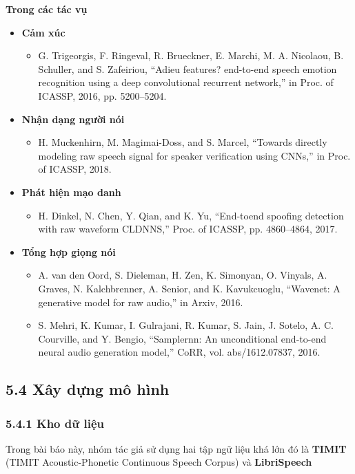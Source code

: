 \documentclass{article}
\begin{document}
	\textbf{Trong các tác vụ}
	\begin{itemize}
		\item \textbf{Cảm xúc}
		\begin{itemize}
			\item G. Trigeorgis, F. Ringeval, R. Brueckner, E. Marchi,
			M. A. Nicolaou, B. Schuller, and S. Zafeiriou, “Adieu
			features? end-to-end speech emotion recognition using
			a deep convolutional recurrent network,” in Proc. of
			ICASSP, 2016, pp. 5200–5204.
		\end{itemize}
		\item \textbf{Nhận dạng người nói}
		\begin{itemize}
			\item H. Muckenhirn, M. Magimai-Doss, and S. Marcel, “Towards directly modeling raw speech signal for speaker
			verification using CNNs,” in Proc. of ICASSP, 2018.
		\end{itemize}
		\item \textbf{Phát hiện mạo danh}
		\begin{itemize}
			\item H. Dinkel, N. Chen, Y. Qian, and K. Yu, “End-toend spoofing detection with raw waveform CLDNNS,”
			Proc. of ICASSP, pp. 4860–4864, 2017.
		\end{itemize}
		\item \textbf{Tổng hợp giọng nói}
		\begin{itemize}
			\item A. van den Oord, S. Dieleman, H. Zen, K. Simonyan,
			O. Vinyals, A. Graves, N. Kalchbrenner, A. Senior, and
			K. Kavukcuoglu, “Wavenet: A generative model for raw
			audio,” in Arxiv, 2016.
			\item S. Mehri, K. Kumar, I. Gulrajani, R. Kumar, S. Jain,
			J. Sotelo, A. C. Courville, and Y. Bengio, “Samplernn:
			An unconditional end-to-end neural audio generation
			model,” CoRR, vol. abs/1612.07837, 2016.
		\end{itemize}
	\end{itemize}
	
	\subsection{5.4 Xây dựng mô hình}
	
	\subsubsection{5.4.1 Kho dữ liệu}
	\qquad Trong bài báo này, nhóm tác giả sử dụng hai tập ngữ liệu khá lớn đó là \textbf{TIMIT} (TIMIT Acoustic-Phonetic Continuous Speech Corpus) và \textbf{LibriSpeech}
	
\end{document}
